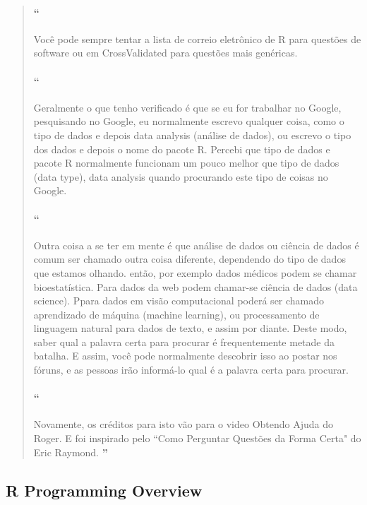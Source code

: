 \begin{quotation}
\begin{small}
\paragraph{``}
Você pode sempre tentar a lista de correio eletrônico de R para questões de software ou em CrossValidated para questões mais genéricas. 

\paragraph{``}
Geralmente o que tenho verificado é que se eu for trabalhar no Google, pesquisando no Google, eu normalmente escrevo qualquer coisa, como o tipo de dados e depois data analysis (análise de dados), ou escrevo o tipo dos dados e depois o nome do pacote R. Percebi que tipo de dados e pacote R normalmente funcionam um pouco melhor que tipo de dados (data type), data analysis quando procurando este tipo de coisas no Google. 

\paragraph{``}
Outra coisa a se ter em mente é que  análise de dados ou ciência de dados é comum ser chamado outra coisa diferente,  dependendo do tipo de dados que estamos olhando. então, por exemplo dados médicos podem se chamar bioestatística. Para dados da web podem chamar-se ciência de dados (data science). Ppara dados em visão computacional poderá ser chamado aprendizado de máquina (machine learning), ou processamento de linguagem natural para dados de texto, e assim por diante. Deste modo, saber qual a palavra certa para procurar é frequentemente metade da batalha. E assim, você pode normalmente descobrir isso ao postar nos fóruns, e as pessoas irão informá-lo qual é a palavra certa para procurar. 

\paragraph{``}
Novamente, os créditos para isto vão para o video Obtendo Ajuda do Roger. E foi inspirado pelo ``Como Perguntar Questões da Forma Certa" do Eric Raymond.
{\large\textbf{''}}
\end{small}
\end{quotation}


\subsection{R Programming Overview}

